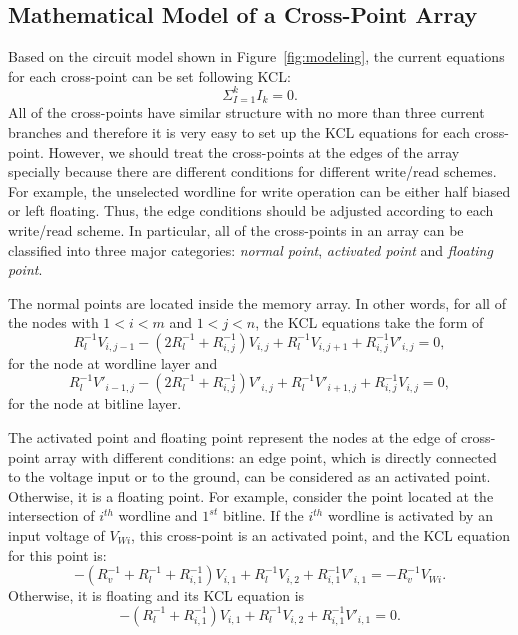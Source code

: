 \subsection{Mathematical Model of a Cross-Point Array}
Based on the circuit model shown in Figure~\ref{fig:modeling}, the current equations for each cross-point can be set following KCL:
\begin{equation}
  {\Sigma}_{I=1}^kI_k=0.
\end{equation}
 All of the cross-points have similar structure with no more than three current branches and therefore it is very easy to set up the KCL equations for each cross-point. However, we should treat the cross-points at the edges of the array specially because there are different conditions for different write/read schemes. For example, the unselected wordline for write operation can be either half biased or left floating. Thus, the edge conditions should be adjusted according to each write/read scheme. In particular, all of the cross-points in an array can be classified into three major categories: \emph{normal point}, \emph{activated point} and \emph{floating point}.

The normal points are located inside the memory array. In other words, for all of the nodes with $1<i<m$ and $1<j<n$, the KCL equations take the form of
\begin{equation}\label{equ:KCL1}
R_l^{-1}V_{i,j-1} -(2R_l^{-1}+R_{i,j}^{-1})V_{i,j}+ R_l^{-1}V_{i,j+1}+R_{i,j}^{-1}V'_{i,j}=0,
\end{equation}
for the node at wordline layer and
\begin{equation}\label{equ:KCL2}
R_l^{-1}V'_{i-1,j} -(2R_l^{-1}+R_{i,j}^{-1})V'_{i,j}+ R_l^{-1}V'_{i+1,j}+R_{i,j}^{-1}V_{i,j}=0,
\end{equation}
for the node at bitline layer.

The activated point and floating point represent the nodes at the edge of cross-point array with different conditions: an edge point, which is directly connected to the voltage input or to the ground, can be considered as an activated point. Otherwise, it is a floating point. For example, consider the point located at the intersection of $i^{th}$ wordline and $1^{st}$ bitline. If the $i^{th}$ wordline is activated by an input voltage of $V_{Wi}$, this cross-point is an activated point, and the KCL equation for this point is:
\begin{equation}\label{equ:KCL3}
-(R_v^{-1}+R_l^{-1}+R_{i,1}^{-1})V_{i,1}+ R_l^{-1}V_{i,2}+R_{i,1}^{-1}V'_{i,1}=-R_v^{-1}V_{Wi}.
\end{equation}
Otherwise, it is floating and its KCL equation is
\begin{equation}\label{equ:KCL4}
-(R_l^{-1}+R_{i,1}^{-1})V_{i,1}+ R_l^{-1}V_{i,2}+R_{i,1}^{-1}V'_{i,1}=0.
\end{equation}

